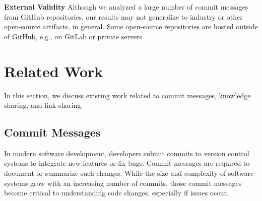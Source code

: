 \documentclass[smallextended]{svjour3}       %
\begin{document}
\textbf{External Validity} Although we analyzed a large number of commit messages from GitHub repositories, our
results may not generalize to industry or other open-source artifacts, in general. Some open-source repositories are hosted outside of GitHub, e.g., on GitLab or private servers.


\section{Related Work}
\label{sec:rw}
In this section, we discuss existing work related to commit messages, knowledge sharing, and link sharing.

\subsection{Commit Messages}
In modern software development, developers submit commits to version control systems to integrate new features or fix bugs.
Commit messages are required to document or summarize such changes.
While the size and complexity of software systems grow with an increasing number of commits, those commit messages become critical to understanding code changes, especially if issues occur. 
\end{document}
